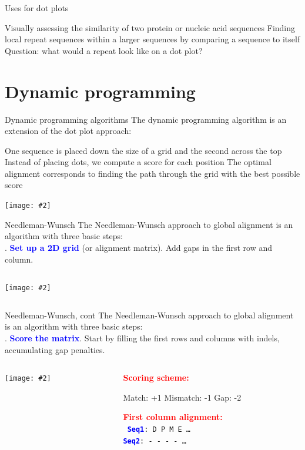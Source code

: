 \documentclass{beamer}
\renewcommand{\c}[1]{\begin{center}#1\end{center}}
\newcommand{\blu}[1]{\textcolor{blue}{\textbf{#1}}}
\newcommand{\red}[1]{\textcolor{red}{\textbf{#1}}}
\newcommand{\gr}[2][.95]{\c{\texttt{[image: \#2]}}}
\begin{document}
\begin{frame}{Uses for dot plots}
\begin{outline}
\1 Visually assessing the similarity of two protein or nucleic acid sequences
\1 Finding local repeat sequences within a larger sequences by comparing a sequence to itself
    \2 Question: what would a repeat look like on a dot plot?
\end{outline}
\end{frame}

\section{Dynamic programming}

\begin{frame}{Dynamic programming algorithms}
The dynamic programming algorithm is an extension of the dot plot approach:
\begin{outline}
\1 One sequence is placed down the size of a grid and the second across the top
\1 Instead of placing dots, we compute a score for each position
\1 The optimal alignment corresponds to finding the path through the grid with the best possible score
\end{outline}
\gr{l3_figs/s29_dynamic.png}
\end{frame}

\begin{frame}{Needleman-Wunsch}
The Needleman-Wunsch approach to global alignment is an algorithm with three basic steps:\\
. \blu{Set up a 2D grid} (or alignment matrix). Add gaps in the first row and column.
\begin{columns}
\begin{column}{0.5\textwidth}
    \gr{l3_figs/s30_nw.png}
\end{column}
\begin{column}{0.5\textwidth}
\hspace{1em}
\end{column}
\end{columns}
\end{frame}

\begin{frame}{Needleman-Wunsch, cont}
The Needleman-Wunsch approach to global alignment is an algorithm with three basic steps:\\
. \blu{Score the matrix}. Start by filling the first rows and columns with indels, accumulating gap penalties.
\begin{columns}
\begin{column}{0.5\textwidth}
    \gr{l3_figs/s31_nw.png}
\end{column}
\begin{column}{0.5\textwidth}
\tiny
\red{Scoring scheme:}
\begin{outline}
\1 Match: +1
\1 Mismatch: -1
\1 Gap: -2
\end{outline}
\bigskip
\red{First column alignment:}\\
\noindent
\texttt{%
\blu{Seq1}: D P M E \ldots\\
\blu{Seq2}: - - - - \ldots
}
\end{column}
\end{columns}
\end{frame}
\end{document}
